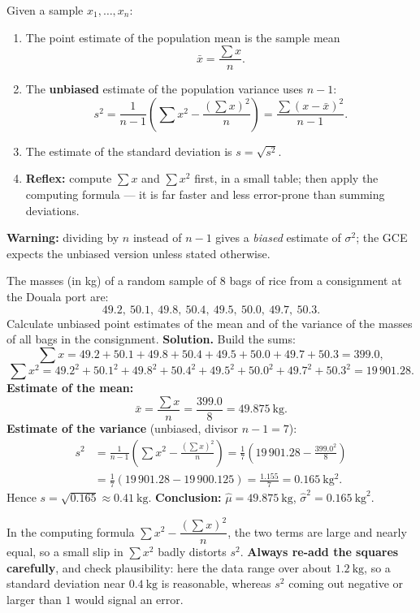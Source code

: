 \documentclass[11pt]{article}
\newcommand{\cle}[1]{{\popxbold\color{popdark}#1}}
\begin{document}
\begin{methode}
Given a sample $x_1,\dots,x_n$:
\begin{enumerate}
\item The \cle{point estimate} of the population mean is the sample mean
\[
\bar{x}=\frac{\sum x}{n}.
\]
\item The \textbf{unbiased} estimate of the population variance uses $n-1$:
\[
s^2=\frac{1}{n-1}\left(\sum x^2-\frac{(\sum x)^2}{n}\right)=\frac{\sum(x-\bar x)^2}{n-1}.
\]
\item The estimate of the standard deviation is $s=\sqrt{s^2}$.
\item \textbf{Reflex:} compute $\sum x$ and $\sum x^2$ first, in a small table; then apply the computing formula — it is far faster and less error-prone than summing deviations.
\end{enumerate}
\textbf{Warning:} dividing by $n$ instead of $n-1$ gives a \emph{biased} estimate of $\sigma^2$; the GCE expects the unbiased version unless stated otherwise.
\end{methode}

\begin{exoresolu}
The masses (in kg) of a random sample of $8$ bags of rice from a consignment at the Douala port are:
\[
49.2,\ 50.1,\ 49.8,\ 50.4,\ 49.5,\ 50.0,\ 49.7,\ 50.3.
\]
Calculate unbiased point estimates of the mean and of the variance of the masses of all bags in the consignment.
\tcblower
\textbf{Solution.} Build the sums:
\[
\sum x = 49.2+50.1+49.8+50.4+49.5+50.0+49.7+50.3 = 399.0,
\]
\[
\sum x^2 = 49.2^2+50.1^2+49.8^2+50.4^2+49.5^2+50.0^2+49.7^2+50.3^2 = 19\,901.28.
\]
\textbf{Estimate of the mean:}
\[
\bar{x}=\frac{\sum x}{n}=\frac{399.0}{8}=49.875\ \mathrm{kg}.
\]
\textbf{Estimate of the variance} (unbiased, divisor $n-1=7$):
\begin{align*}
s^2 &= \frac{1}{n-1}\left(\sum x^2 - \frac{(\sum x)^2}{n}\right)
= \frac{1}{7}\left(19\,901.28-\frac{399.0^2}{8}\right)\\
&= \frac{1}{7}\left(19\,901.28-19\,900.125\right)
= \frac{1.155}{7} = 0.165\ \mathrm{kg^2}.
\end{align*}
Hence $s=\sqrt{0.165}\approx 0.41\ \mathrm{kg}$.
\textbf{Conclusion:} $\hat{\mu}=49.875\ \mathrm{kg}$, $\hat{\sigma}^2 = 0.165\ \mathrm{kg}^2$.
\end{exoresolu}

\begin{attention}
In the computing formula $\sum x^2 - \dfrac{(\sum x)^2}{n}$, the two terms are large and nearly equal, so a small slip in $\sum x^2$ badly distorts $s^2$. \textbf{Always re-add the squares carefully}, and check plausibility: here the data range over about $1.2\ \mathrm{kg}$, so a standard deviation near $0.4\ \mathrm{kg}$ is reasonable, whereas $s^2$ coming out negative or larger than $1$ would signal an error.
\end{attention}
\end{document}
